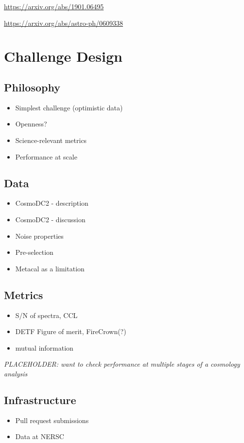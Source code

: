 \documentclass[twocolumn,twocolappendix]{aastex63}
\newcommand{\placeholder}[1]{\textit{PLACEHOLDER: #1}}
\begin{document}
\url{https://arxiv.org/abs/1901.06495}

\url{https://arxiv.org/abs/astro-ph/0609338}

\section{Challenge Design}

\subsection{Philosophy}
\begin{itemize}
    \item Simplest challenge (optimistic data)
    \item Openness?
    \item Science-relevant metrics
    \item Performance at scale
\end{itemize}

\subsection{Data}

\begin{itemize}
    \item CosmoDC2 - description
    \item CosmoDC2 - discussion
    \item Noise properties
    \item Pre-selection 
    \item Metacal as a limitation
\end{itemize}

\subsection{Metrics}
\label{sec:metrics}


\begin{itemize}
    \item S/N of spectra, CCL
    \item DETF Figure of merit, FireCrown(?)
    \item mutual information
\end{itemize}


\placeholder{want to check performance at multiple stages of a cosmology analysis}

\subsection{Infrastructure}
\begin{itemize}
    \item Pull request submissions
    \item Data at NERSC
\end{itemize}
\end{document}
